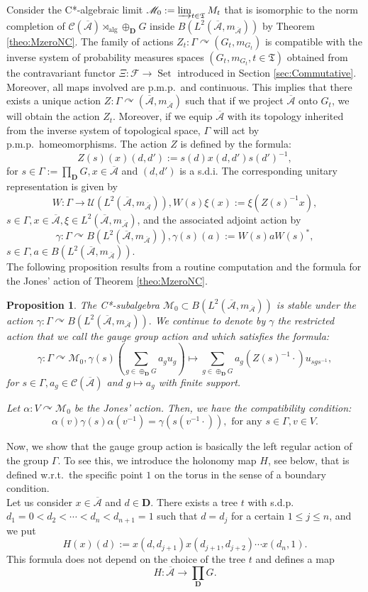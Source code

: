 \documentclass[a4paper,12pt]{amsart}
\numberwithin{equation}{section}
\newtheorem{proposition}[theo]{Proposition}
\theoremstyle{definition}
\newcommand{\act}{\curvearrowright}
\newcommand{\al}{\alpha}
\newcommand{\oscrA}{{\overline{\mathscr{A}}}}
\DeclareMathOperator{\alg}{alg}
\newcommand{\scrC}{\mathscr C}
\newcommand{\D}{\mathbf D}
\newcommand{\cF}{\mathcal F}
\newcommand{\ga}{\gamma}
\newcommand{\Ga}{\Gamma}
\newcommand{\Gd}{\oplus_\D G}
\newcommand{\scrM}{\mathscr M}
\DeclareMathOperator{\Set}{Set}
\newcommand{\fT}{\mathfrak T}
\newcommand{\cU}{\mathcal U}
\begin{document}
Consider the C*-algebraic limit $\scrM_0:=\varinjlim_{t\in\fT} M_t$ that is isomorphic to the norm completion of $\scrC(\oscrA)\rtimes_{\alg} \Gd$ inside $B(L^2(\oscrA,m_\oscrA))$ by Theorem \ref{theo:MzeroNC}.
The family of actions $Z_t:\Ga\act(G_t,m_{G_t})$ is compatible with the inverse system of probability measures spaces $(G_t,m_{G_t}, t\in\fT)$ obtained from the contravariant functor $\Xi:\cF\to \Set$ introduced in Section \ref{sec:Commutative}.
Moreover, all maps involved are p.m.p.~and continuous.
This implies that there exists a unique action 
$Z:\Ga\act (\oscrA,m_\oscrA)$ such that if we project $\oscrA$ onto $G_t$, we will obtain the action $Z_t$.
Moreover, if we equip $\oscrA$ with its topology inherited from the inverse system of topological space, $\Ga$ will act by p.m.p.~homeomorphisms.
The action $Z$ is defined by the formula:
$$Z(s)(x)(d,d') := s(d) x(d,d') s(d')^{-1},$$
for $s\in \Ga:=\prod_\D G, x\in \oscrA$ and $(d,d')$ is a s.d.i.
The corresponding unitary representation is given by
$$W:\Ga\to \cU(L^2(\oscrA,m_\oscrA)), W(s) \xi(x):= \xi(Z(s)^{-1} x),$$
$s\in  \Ga, x\in \oscrA, \xi \in L^2(\oscrA,m_\oscrA)$, and the associated adjoint action by
$$\ga:\Ga\act B(L^2(\oscrA,m_\oscrA)), \ga(s)(a):= W(s) a W(s)^*,$$
$s\in \Ga, a \in B(L^2(\oscrA,m_\oscrA))$.\\[0.1cm]
The following proposition results from a routine computation and the formula for the Jones' action of Theorem \ref{theo:MzeroNC}.

\begin{proposition}\label{prop:gaugeCstar}
The C*-subalgebra $\scrM_0\subset B(L^2(\oscrA,m_\oscrA))$ is stable under the action $\ga:\Ga\act B(L^2(\oscrA,m_\oscrA)).$
We continue to denote by $\ga$ the restricted action that we call the gauge group action and which satisfies the formula:
$$\ga : \Ga\act \scrM_0, \ga(s)\left(\sum_{g\in \oplus_\D G} a_g u_g\right)\mapsto \sum_{g\in \oplus_\D G} a_g(Z(s)^{-1}\cdot ) u_{sgs^{-1}},$$
for $s\in \Ga, a_g\in\scrC(\oscrA)$ and $g\mapsto a_g$ with finite support.

Let $\al:V\act \scrM_0$ be the Jones' action.
Then, we have the compatibility condition:
$$\al(v) \ga(s) \al(v^{-1}) = \ga( s(v^{-1}\cdot) ),\text{ for any } s\in \Ga, v\in V.$$
\end{proposition}

Now, we show that the gauge group action is basically the left regular action of the group $\Ga$.
To see this, we introduce the holonomy map $H$, see below, that is defined w.r.t.~the specific point $1$ on the torus in the sense of a boundary condition.\\[0.1cm]
Let us consider $x\in \oscrA$ and $d\in\D$.
There exists a tree $t$ with s.d.p.~$d_1=0<d_2<\cdots <d_n<d_{n+1}=1$ such that $d=d_j$ for a certain $1\leq j\leq n$, and we put 
$$H(x)(d) := x(d,d_{j+1} ) x(d_{j+1},d_{j+2})\cdots x(d_n,1).$$
This formula does not depend on the choice of the tree $t$ and defines a map 
$$H:\oscrA\to \prod_\D G.$$
\end{document}
